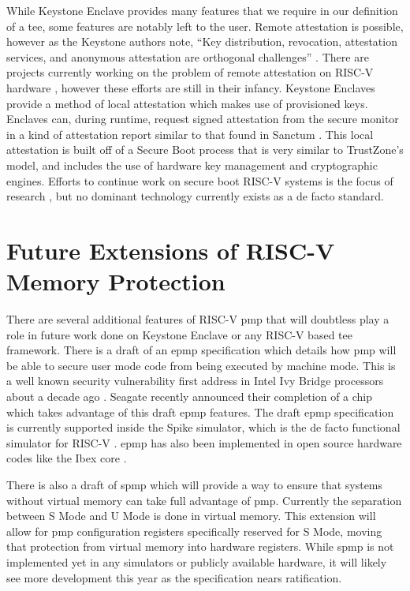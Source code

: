 While Keystone Enclave provides many features that we require in our definition of a \gls{tee}, some features are notably left to the user. Remote attestation is possible, however as the Keystone authors note, ``Key distribution, revocation, attestation services, and anonymous attestation are orthogonal challenges'' \cite{lee2019keystone}. There are projects currently working on the problem of remote attestation on RISC-V hardware \cite{shepherd2021lira}, however these efforts are still in their infancy. Keystone Enclaves provide a method of local attestation which makes use of provisioned keys. Enclaves can, during runtime, request signed attestation from the secure monitor in a kind of attestation report similar to that found in Sanctum \cite{lebedev2018secure}. This local attestation is built off of a Secure Boot process that is very similar to TrustZone's model, and includes the use of hardware key management and cryptographic engines. Efforts to continue work on secure boot RISC-V systems is the focus of research \cite{haj2019lightweight}, but no dominant technology currently exists as a de facto standard.

\section{Future Extensions of RISC-V Memory Protection}

There are several additional features of RISC-V \gls{pmp} that will doubtless play a role in future work done on Keystone Enclave or any RISC-V based \gls{tee} framework. There is a draft of an \gls{epmp} specification which details how \gls{pmp} will be able to secure user mode code from being executed by machine mode. This is a well known security vulnerability first address in Intel Ivy Bridge processors about a decade ago \cite{6922075}. Seagate recently announced their completion of a chip which takes advantage of this draft \gls{epmp} features. The draft \gls{epmp} specification is currently supported inside the Spike simulator, which is the de facto functional simulator for RISC-V \cite{asanovic2016rocket}. \gls{epmp} has also been implemented in open source hardware codes like the Ibex core \cite{urlIbex}.

There is also a draft of \gls{spmp} which will provide a way to ensure that systems without virtual memory can take full advantage of \gls{pmp}. Currently the separation between S Mode and U Mode is done in virtual memory. This extension will allow for \gls{pmp} configuration registers specifically reserved for S Mode, moving that protection from virtual memory into hardware registers. While \gls{spmp} is not implemented yet in any simulators or publicly available hardware, it will likely see more development this year as the specification nears ratification.

